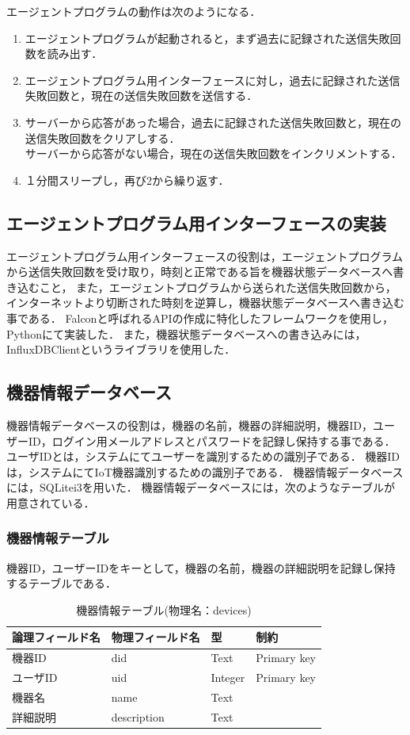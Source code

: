 エージェントプログラムの動作は次のようになる．
\begin{enumerate}
\item エージェントプログラムが起動されると，まず過去に記録された送信失敗回数を読み出す．
\item エージェントプログラム用インターフェースに対し，過去に記録された送信失敗回数と，現在の送信失敗回数を送信する．%
\item サーバーから応答があった場合，過去に記録された送信失敗回数と，現在の送信失敗回数をクリアしする．\\
サーバーから応答がない場合，現在の送信失敗回数をインクリメントする．
\item １分間スリープし，再び2から繰り返す．
\end{enumerate}


\subsection{エージェントプログラム用インターフェースの実装}
エージェントプログラム用インターフェースの役割は，エージェントプログラムから送信失敗回数を受け取り，時刻と正常である旨を機器状態データベースへ書き込むこと，
また，エージェントプログラムから送られた送信失敗回数から，インターネットより切断された時刻を逆算し，機器状態データベースへ書き込む事である．
Falconと呼ばれるAPIの作成に特化したフレームワークを使用し，Pythonにて実装した．
また，機器状態データベースへの書き込みには，InfluxDBClientというライブラリを使用した．

\subsection{機器情報データベース}
機器情報データベースの役割は，機器の名前，機器の詳細説明，機器ID，ユーザーID，ログイン用メールアドレスとパスワードを記録し保持する事である．
ユーザIDとは，システムにてユーザーを識別するための識別子である．
機器IDは，システムにてIoT機器識別するための識別子である．
機器情報データベースには，SQLitei3を用いた．
機器情報データベースには，次のようなテーブルが用意されている．
\subsubsection{機器情報テーブル}
機器ID，ユーザーIDをキーとして，機器の名前，機器の詳細説明を記録し保持するテーブルである．
\begin{table}[htb]
\begin{center}
\caption{機器情報テーブル(物理名：devices)}
\begin{tabular}{|l|l|l|l|} \hline
論理フィールド名 & 物理フィールド名 & 型 & 制約\\ \hline \hline
機器ID & did & Text & Primary key \\
ユーザID & uid & Integer & Primary key \\
機器名 & name & Text &  \\
詳細説明 & description & Text &  \\ \hline
\end{tabular}
\label{tab:}
\end{center}
\end{table}

